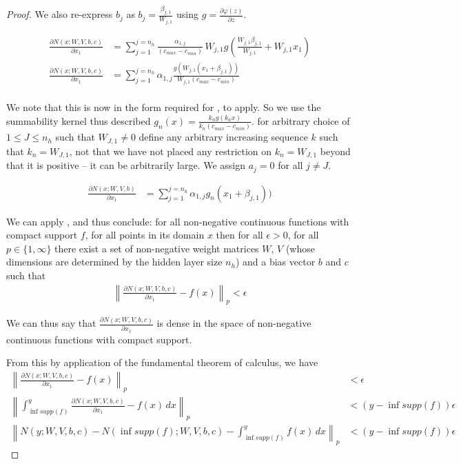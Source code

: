 \documentclass{article} %
\begin{document}
\begin{proof}
We also re-express $b_j$ as $b_j=\frac{\beta_{j,1}}{W_{j,1}}$  using $g = \frac{\partial\varphi(z)}{\partial z}$.


\begin{align}
\frac{\partial N(x;W,V,b,c)}{\partial x_1} 
&= \sum_{j=1}^{j=n_h} \frac{\alpha_{1,j}}{(c_{max}-c_{min})} \, W_{j,1} g(\frac{W_{j,1}\beta_{j,1}}{W_{j,1}} + W_{j,1}x_1)\\
\frac{\partial N(x;W,V,b,c)}{\partial x_1} 
&= \sum_{j=1}^{j=n_h} \alpha_{1,j} \frac{ g(W_{j,1}\left( x_1 + \beta_{j,1} \right))}{W_{j,1}(c_{max}-c_{min})} \\
\end{align}

We note that this is now in the form required for ,
to apply.
So we use the summability kernel thus described $g_n(x) = \frac{k_n g(k_n x)}{k_n(c_{max}-c_{min})}$.
for arbitrary choice of $1 \le J \le n_h$ such that $W_{J,1} \ne 0$
define any arbitrary increasing sequence $k$ such that $k_n=W_{J,1}$,
not that we have not placed any restriction on $k_n=W_{J,1}$ beyond that it is positive -- it can be arbitrarily large.
We assign  $a_j=0$ for all $j \ne J$.


\begin{align}
\frac{\partial N(x;W,V,b)}{\partial x_1} 
&= \sum_{j=1}^{j=n_h} \alpha_{1,j} g_n\left( x_1 + \beta_{j,1} \right))
\end{align}

We can apply , and thus conclude:
for all non-negative continuous functions with compact support $f$,
for all points in its domain $x$
then for all $\epsilon > 0$, for all $p\in \lbrace 1, \infty \rbrace$
there exist a set of non-negative weight matrices $W$, $V$ (whose dimensions are determined by the hidden layer size $n_h$) and a bias vector $b$ and $c$
such that 
\begin{align}
\left\|\frac{\partial N(x;W,V,b, c)}{\partial x_1} - f(x) \right\|_p < \epsilon
\end{align}

We can thus say that $\frac{\partial N(x;W,V,b,c)}{\partial x_1}$ is dense in the space of non-negative continuous functions with compact support.

From this by application of the fundamental theorem of calculus,
we have
\begin{align}
\left\| \frac{\partial N(x;W,V,b, c)}{\partial x_1} - f(x) \right\|_p &< \epsilon \\
\left\| \int_{\inf supp(f)}^y \frac{\partial N(x;W,V,b, c)}{\partial x_1} - f(x) \, dx \right\|_p &< \left( y-\inf supp(f) \right)  \epsilon \\
\left\| N(y;W,V,b, c) - N(\inf supp(f);W,V,b, c) - \int_{\inf supp(f)}^y f(x) \, dx \right\|_p &< \left( y-\inf supp(f) \right)  \epsilon
\end{align}


\end{proof}
\end{document}
